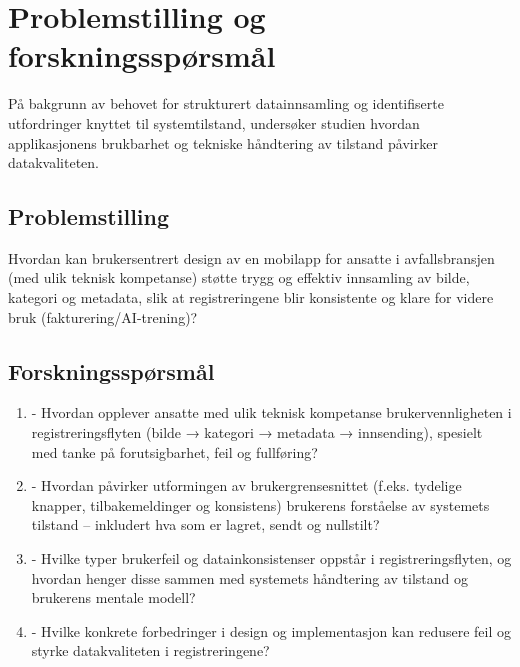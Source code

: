 \section{Problemstilling og forskningsspørsmål}
\label{sec:problemstilling}
På bakgrunn av behovet for strukturert datainnsamling og identifiserte utfordringer knyttet til systemtilstand, undersøker studien hvordan applikasjonens brukbarhet og tekniske håndtering av tilstand påvirker datakvaliteten.

\subsection*{Problemstilling}
Hvordan kan brukersentrert design av en mobilapp for ansatte i avfallsbransjen (med ulik teknisk kompetanse) støtte trygg og effektiv innsamling av bilde, kategori og metadata, slik at registreringene blir konsistente og klare for videre bruk (fakturering/AI-trening)?

\subsection*{Forskningsspørsmål}
\begin{enumerate}
    \item - Hvordan opplever ansatte med ulik teknisk kompetanse brukervennligheten i registreringsflyten (bilde → kategori → metadata → innsending), spesielt med tanke på forutsigbarhet, feil og fullføring?

    \item - Hvordan påvirker utformingen av brukergrensesnittet (f.eks. tydelige knapper, tilbakemeldinger og konsistens) brukerens forståelse av systemets tilstand – inkludert hva som er lagret, sendt og nullstilt?

    \item - Hvilke typer brukerfeil og datainkonsistenser oppstår i registreringsflyten, og hvordan henger disse sammen med systemets håndtering av tilstand og brukerens mentale modell?

    \item - Hvilke konkrete forbedringer i design og implementasjon kan redusere feil og styrke datakvaliteten i registreringene?



\end{enumerate}
